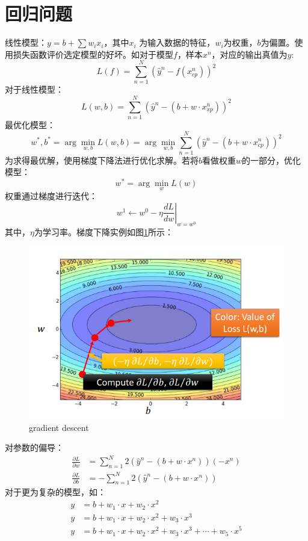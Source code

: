\section{回归问题}
线性模型：$y=b+\sum w_i x_i$，其中$x_i$ 为输入数据的特征，$w_i$为权重，$b$为偏置。使用损失函数评价选定模型的好坏。如对于模型$f$，样本$x^n$，对应的输出真值为$\hat{y}$:
\[
	L(f)=\sum_{n=1}^{N}\left( \hat{y}^n - f(x_{cp}^n) \right)^2
\]
对于线性模型：
\[
	L(w,b)=\sum_{n=1}^{N}\left( \hat{y}^n - (b+w \cdot x_{xp}^n) \right)^2
\]
最优化模型：
\[
	w ^ { * } , b ^ { * } = \arg \min _ { w , b } L ( w , b )= \arg \min _ { w , b } \sum _ { n = 1 } ^ { N } \left( \hat { y } ^ { n } - ( b + w \cdot x _ { c p } ^ { n } ) \right) ^ { 2 }
\]
为求得最优解，使用梯度下降法进行优化求解。若将$b$看做权重$w$的一部分，优化模型：
\[
	w^* = \arg \min_w L(w)
\]
权重通过梯度进行迭代：
\[
w ^1 \leftarrow w ^0 - \eta \left. \frac { d L } { d w } \right| _ {w = w^0}
\]
其中，$\eta$为学习率。梯度下降实例如图\ref{fig:gradientdescent}所示：
\begin{figure}[hb]
	\centering
	\includegraphics[scale=0.8]{pic/gradient_descent.png}
	\caption{gradient descent}
	\label{fig:gradientdescent}
\end{figure}
对参数的偏导：
\begin{align*}
	\frac{ \partial L}{\partial w} &= \sum_{n=1}^{N} 2 \left( \hat{y}^n - (b+w \cdot x^n)  \right) (-x^n) \\
	\frac{ \partial L}{\partial b} &= -\sum_{n=1}^{N} 2 \left( \hat{y}^n - (b+w \cdot x^n)  \right)
\end{align*}
对于更为复杂的模型，如：
\begin{align*}
	y &= b + w_1 \cdot x + w_2 \cdot x^2 \\
	y &= b + w_1 \cdot x + w_2 \cdot x^2 + w_3 \cdot x^3 \\
	y &= b + w_1 \cdot x + w_2 \cdot x^2 + w_3 \cdot x^3 + \cdots + w_5 \cdot x^5
\end{align*}
